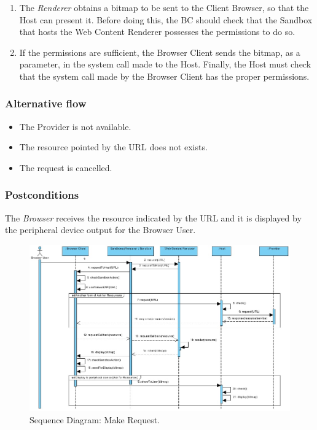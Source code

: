 \documentclass{sig-alternate-05-2015}
\begin{document}
\begin{enumerate}
        \item The \textit {Renderer} obtains a bitmap to be sent to the Client Browser, so that the Host can present it. Before doing this, the BC should check that the Sandbox that hosts the Web Content Renderer possesses the permissions to do so.
        \item If the permissions are sufficient, the Browser Client sends the bitmap, as a parameter, in the system call made to the Host. Finally, the Host must check that the system call made by the Browser Client has the proper permissions.
      \end{enumerate}
    \subsubsection*{Alternative flow} 
    \begin{itemize}
    \item The Provider is not available.
    \item The resource pointed by the URL does not exists.
    \item The request is cancelled.
      \end{itemize}
    \subsubsection*{Postconditions} The \textit{Browser} receives the resource indicated by the URL and it is displayed by the peripheral device output for the Browser User.
      \begin{figure}[h!t]
          \centering
          \includegraphics[scale=0.7]{figures/MakeRequest.jpg}
          \caption{Sequence Diagram: Make Request.}
          \label{fig:SecReq}
      \end{figure}
\end{document}
